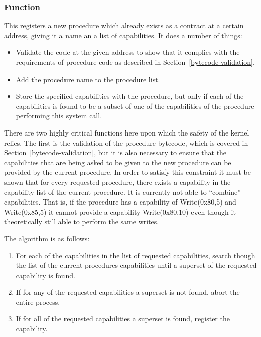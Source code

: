 \documentclass[english,a4paper]{article}
\let\oldparagraph\subsubsection
\renewcommand{\subsubsection}[1]{\oldparagraph{#1}\mbox{}}
\begin{document}
\subsubsection{Function}
This registers a new procedure which already exists as a contract at a certain
address, giving it a name an a list of capabilities. It does a number of things:

\begin{itemize}
  \item Validate the code at the given address to show that it complies with the
  requirements of procedure code as described in
  Section~\ref{bytecode-validation}.
  \item Add the procedure name to the procedure list.
  \item Store the specified capabilities with the procedure, but only if each of
  the capabilities is found to be a subset of one of the capabilities of the
  procedure performing this system call.
\end{itemize}

There are two highly critical functions here upon which the safety of the kernel
relies. The first is the validation of the procedure bytecode, which is covered
in Section~\ref{bytecode-validation}, but it is also necessary to ensure that
the capabilities that are being asked to be given to the new procedure can be
provided by the current procedure. In order to satisfy this constraint it must
be shown that for every requested procedure, there exists a capability in the
capability list of the current procedure. It is currently not able to
``combine'' capabilities. That is, if the procedure has a capability of
Write(0x80,5) and Write(0x85,5) it cannot provide a capability Write(0x80,10)
even though it theoretically still able to perform the same writes.

The algorithm is as follows:

\begin{enumerate}
  \item For each of the capabilities in the list of requested capabilities,
  search though the list of the current procedures capabilities until a superset
  of the requested capability is found.
  \item If for any of the requested capabilities a superset is not found, abort
  the entire process.
  \item If for all of the requested capabilities a superset is found, register
  the capability.
\end{enumerate}
\end{document}
